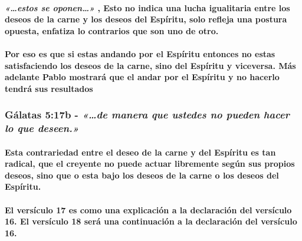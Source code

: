 \documentclass[11a pt,twoside]{article}
\newcommand{\scripture}[1]{%
  {\fontsize{12pt}{16pt}\selectfont\ScriptureFont\itshape #1}%
}
\let\oldsubsubsection\subsubsection
\renewcommand{\subsubsection}{\needspace{4\baselineskip}\oldsubsubsection}
\let\oldparagraph\paragraph
\renewcommand{\paragraph}{\needspace{3\baselineskip}\oldparagraph}
\begin{document}
\paragraph{\texorpdfstring{\scripture{«…estos se oponen…»}, Esto no
indica una lucha igualitaria entre los deseos de la carne y los deseos
del Espíritu, solo refleja una postura opuesta, enfatiza lo contrarios
que son uno de
otro.}{, Esto no indica una lucha igualitaria entre los deseos de la carne y los deseos del Espíritu, solo refleja una postura opuesta, enfatiza lo contrarios que son uno de otro.}}\label{estos-se-oponen-esto-no-indica-una-lucha-igualitaria-entre-los-deseos-de-la-carne-y-los-deseos-del-espuxedritu-solo-refleja-una-postura-opuesta-enfatiza-lo-contrarios-que-son-uno-de-otro.}

\paragraph{Por eso es que si estas andando por el Espíritu entonces no
estas satisfaciendo los deseos de la carne, sino del Espíritu y
viceversa. Más adelante Pablo mostrará que el andar por el Espíritu y no
hacerlo tendrá sus
resultados}\label{por-eso-es-que-si-estas-andando-por-el-espuxedritu-entonces-no-estas-satisfaciendo-los-deseos-de-la-carne-sino-del-espuxedritu-y-viceversa.-muxe1s-adelante-pablo-mostraruxe1-que-el-andar-por-el-espuxedritu-y-no-hacerlo-tendruxe1-sus-resultados}

\subsubsection{\texorpdfstring{Gálatas 5:17b -
\scripture{«…de manera que ustedes no pueden hacer lo que deseen.»}}{Gálatas 5:17b - }}\label{guxe1latas-517b---de-manera-que-ustedes-no-pueden-hacer-lo-que-deseen.}

\paragraph{Esta contrariedad entre el deseo de la carne y del Espíritu
es tan radical, que el creyente no puede actuar libremente según sus
propios deseos, sino que o esta bajo los deseos de la carne o los deseos
del
Espíritu.}\label{esta-contrariedad-entre-el-deseo-de-la-carne-y-del-espuxedritu-es-tan-radical-que-el-creyente-no-puede-actuar-libremente-seguxfan-sus-propios-deseos-sino-que-o-esta-bajo-los-deseos-de-la-carne-o-los-deseos-del-espuxedritu.}

\paragraph{El versículo 17 es como una explicación a la declaración del
versículo 16. El versículo 18 será una continuación a la declaración del
versículo
16.}\label{el-versuxedculo-17-es-como-una-explicaciuxf3n-a-la-declaraciuxf3n-del-versuxedculo-16.-el-versuxedculo-18-seruxe1-una-continuaciuxf3n-a-la-declaraciuxf3n-del-versuxedculo-16.}
\end{document}
